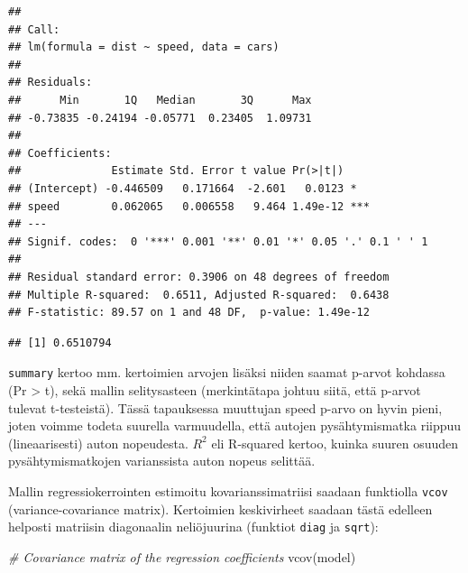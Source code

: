 \documentclass[
]{book}
\newenvironment{Shaded}{\begin{snugshade}}{\end{snugshade}}
\newcommand{\CommentTok}[1]{\textcolor[rgb]{0.56,0.35,0.01}{\textit{#1}}}
\newcommand{\FunctionTok}[1]{\textcolor[rgb]{0.00,0.00,0.00}{#1}}
\newcommand{\NormalTok}[1]{#1}
\newcommand{\OtherTok}[1]{\textcolor[rgb]{0.56,0.35,0.01}{#1}}
\newcommand{\SpecialCharTok}[1]{\textcolor[rgb]{0.00,0.00,0.00}{#1}}
\begin{document}
\begin{verbatim}
## 
## Call:
## lm(formula = dist ~ speed, data = cars)
## 
## Residuals:
##      Min       1Q   Median       3Q      Max 
## -0.73835 -0.24194 -0.05771  0.23405  1.09731 
## 
## Coefficients:
##              Estimate Std. Error t value Pr(>|t|)    
## (Intercept) -0.446509   0.171664  -2.601   0.0123 *  
## speed        0.062065   0.006558   9.464 1.49e-12 ***
## ---
## Signif. codes:  0 '***' 0.001 '**' 0.01 '*' 0.05 '.' 0.1 ' ' 1
## 
## Residual standard error: 0.3906 on 48 degrees of freedom
## Multiple R-squared:  0.6511, Adjusted R-squared:  0.6438 
## F-statistic: 89.57 on 1 and 48 DF,  p-value: 1.49e-12
\end{verbatim}

\begin{Shaded}
\end{Shaded}

\begin{verbatim}
## [1] 0.6510794
\end{verbatim}

\texttt{summary} kertoo mm. kertoimien arvojen lisäksi niiden saamat p-arvot kohdassa (Pr \textgreater{} \textbar t\textbar), sekä mallin selitysasteen (merkintätapa johtuu siitä, että p-arvot tulevat t-testeistä). Tässä tapauksessa muuttujan speed p-arvo on hyvin pieni, joten voimme todeta suurella varmuudella, että autojen pysähtymismatka riippuu (lineaarisesti) auton nopeudesta. \(R^2\) eli R-squared kertoo, kuinka suuren osuuden pysähtymismatkojen varianssista auton nopeus selittää.

Mallin regressiokerrointen estimoitu kovarianssimatriisi saadaan funktiolla \texttt{vcov} (variance-covariance matrix). Kertoimien keskivirheet saadaan tästä edelleen helposti matriisin diagonaalin neliöjuurina (funktiot \texttt{diag} ja \texttt{sqrt}):

\begin{Shaded}
\begin{Highlighting}[]
\CommentTok{\# Covariance matrix of the regression coefficients}
\FunctionTok{vcov}\NormalTok{(model)}
\end{Highlighting}
\end{Shaded}
\end{document}
